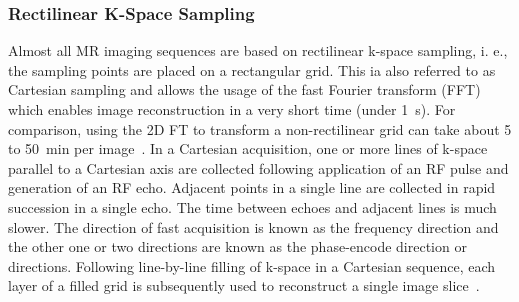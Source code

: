 \subsubsection{Rectilinear K-Space Sampling}
Almost all MR imaging sequences 
are based on rectilinear k-space sampling, i. e., the sampling points 
are placed on a rectangular grid. This 
ia also referred to as Cartesian sampling and 
allows the usage of the fast Fourier transform (FFT) 
which enables 
image reconstruction in 
a very short time (under 1~s). 
For comparison, using
the 
2D FT 
to transform a non-rectilinear grid can take about
5 to 50~min per image~\cite{SamplingStrategies}.
In a Cartesian acquisition, one or more lines of k-space parallel to a Cartesian axis are collected following application of an RF pulse and generation of an RF echo. Adjacent points in a single line are collected in rapid succession in a single echo. The time between echoes and adjacent lines is much slower. The direction of fast acquisition is known as the frequency direction and the other one or two directions are known as the phase-encode direction or directions. Following line-by-line filling of k-space in a Cartesian sequence, each layer of a filled grid is subsequently used to reconstruct a single image slice~\cite{Bardo2021}.

